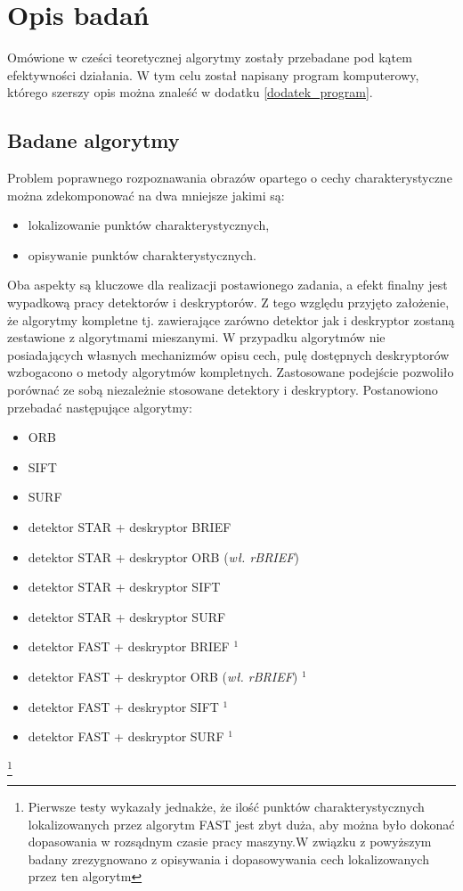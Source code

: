 \chapter{Opis badań}
Omówione w cześci teoretycznej algorytmy zostały przebadane pod kątem efektywności działania.
W tym celu został napisany program komputerowy, którego szerszy opis można znaleść w dodatku \ref{dodatek_program}.
\FloatBarrier 
\section{Badane algorytmy}
Problem poprawnego rozpoznawania obrazów opartego o cechy charakterystyczne można zdekomponować na dwa mniejsze jakimi są:
\begin{itemize}
\item lokalizowanie punktów charakterystycznych,
\item opisywanie punktów charakterystycznych.
\end{itemize}
Oba aspekty są kluczowe dla realizacji postawionego zadania, a efekt finalny jest wypadkową pracy detektorów i deskryptorów. Z tego względu przyjęto założenie, że algorytmy kompletne tj. zawierające zarówno detektor jak i deskryptor zostaną zestawione z algorytmami mieszanymi. W przypadku algorytmów nie posiadających własnych mechanizmów opisu cech, pulę dostępnych deskryptorów wzbogacono o metody algorytmów kompletnych. Zastosowane podejście pozwoliło porównać ze sobą niezależnie stosowane detektory i deskryptory.
Postanowiono przebadać następujące algorytmy:
\begin{itemize}
\item ORB
\item SIFT
\item SURF
\item detektor STAR + deskryptor BRIEF
\item detektor STAR + deskryptor ORB (\textit{wł. rBRIEF})
\item detektor STAR + deskryptor SIFT
\item detektor STAR + deskryptor SURF
\item detektor FAST + deskryptor BRIEF $^1$
\item detektor FAST + deskryptor ORB (\textit{wł. rBRIEF}) $^1$
\item detektor FAST + deskryptor SIFT $^1$
\item detektor FAST + deskryptor SURF $^1$
\end{itemize}
\footnote{Pierwsze testy wykazały jednakże, że ilość punktów charakterystycznych lokalizowanych przez algorytm FAST jest zbyt duża, aby można było dokonać dopasowania w rozsądnym czasie pracy maszyny.W związku z powyższym badany zrezygnowano z opisywania i dopasowywania cech lokalizowanych przez ten algorytm}

